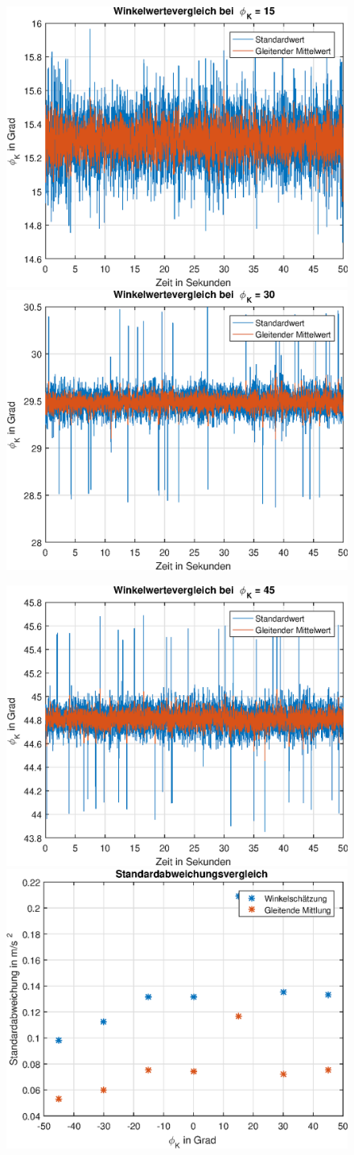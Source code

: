 \documentclass{article}
\begin{document}
\newpage
\begin{figure}[h]
	\includegraphics[width=0.5\linewidth]{img/phiK15_floatingMean_degree.eps}
	\includegraphics[width=0.5\linewidth]{img/phiK30_floatingMean_degree.eps}
\end{figure}
\begin{figure}[h]
	\includegraphics[width=0.5\linewidth]{img/phiK45_floatingMean_degree.eps}
	\includegraphics[width=0.5\linewidth]{img/degree_floatingMean_sd.eps}
\end{figure}
\end{document}
